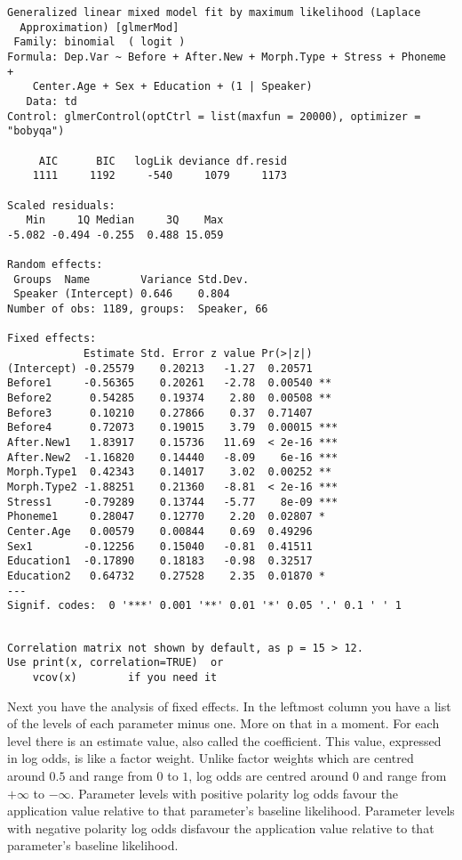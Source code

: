 \documentclass[
  10pt,
  letterpaper]{article}
\begin{document}
\begin{verbatim}
Generalized linear mixed model fit by maximum likelihood (Laplace
  Approximation) [glmerMod]
 Family: binomial  ( logit )
Formula: Dep.Var ~ Before + After.New + Morph.Type + Stress + Phoneme +  
    Center.Age + Sex + Education + (1 | Speaker)
   Data: td
Control: glmerControl(optCtrl = list(maxfun = 20000), optimizer = "bobyqa")

     AIC      BIC   logLik deviance df.resid 
    1111     1192     -540     1079     1173 

Scaled residuals: 
   Min     1Q Median     3Q    Max 
-5.082 -0.494 -0.255  0.488 15.059 

Random effects:
 Groups  Name        Variance Std.Dev.
 Speaker (Intercept) 0.646    0.804   
Number of obs: 1189, groups:  Speaker, 66

Fixed effects:
            Estimate Std. Error z value Pr(>|z|)    
(Intercept) -0.25579    0.20213   -1.27  0.20571    
Before1     -0.56365    0.20261   -2.78  0.00540 ** 
Before2      0.54285    0.19374    2.80  0.00508 ** 
Before3      0.10210    0.27866    0.37  0.71407    
Before4      0.72073    0.19015    3.79  0.00015 ***
After.New1   1.83917    0.15736   11.69  < 2e-16 ***
After.New2  -1.16820    0.14440   -8.09    6e-16 ***
Morph.Type1  0.42343    0.14017    3.02  0.00252 ** 
Morph.Type2 -1.88251    0.21360   -8.81  < 2e-16 ***
Stress1     -0.79289    0.13744   -5.77    8e-09 ***
Phoneme1     0.28047    0.12770    2.20  0.02807 *  
Center.Age   0.00579    0.00844    0.69  0.49296    
Sex1        -0.12256    0.15040   -0.81  0.41511    
Education1  -0.17890    0.18183   -0.98  0.32517    
Education2   0.64732    0.27528    2.35  0.01870 *  
---
Signif. codes:  0 '***' 0.001 '**' 0.01 '*' 0.05 '.' 0.1 ' ' 1
\end{verbatim}

\begin{verbatim}

Correlation matrix not shown by default, as p = 15 > 12.
Use print(x, correlation=TRUE)  or
    vcov(x)        if you need it
\end{verbatim}

Next you have the analysis of fixed effects. In the leftmost column you
have a list of the levels of each parameter minus one. More on that in a
moment. For each level there is an estimate value, also called the
coefficient. This value, expressed in log odds, is like a factor weight.
Unlike factor weights which are centred around \(0.5\) and range from
\(0\) to \(1\), log odds are centred around \(0\) and range from
\(+\infty\) to \(-\infty\). Parameter levels with positive polarity log
odds favour the application value relative to that parameter's baseline
likelihood. Parameter levels with negative polarity log odds disfavour
the application value relative to that parameter's baseline likelihood.
\end{document}
